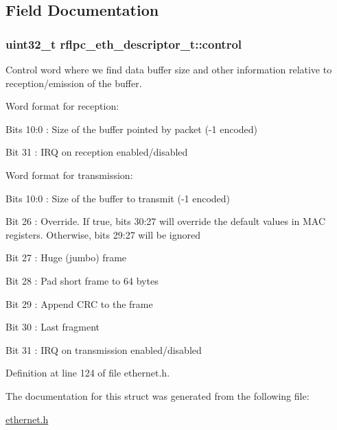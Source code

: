 \subsection{Field Documentation}
\hypertarget{structrflpc__eth__descriptor__t_ae45a50fb32e3ce25a5802290397dfe7e}{
\subsubsection[{control}]{\setlength{\rightskip}{0pt plus 5cm}uint32\-\_\-t {\bf rflpc\-\_\-eth\-\_\-descriptor\-\_\-t\-::control}}}\label{structrflpc__eth__descriptor__t_ae45a50fb32e3ce25a5802290397dfe7e}


Control word where we find data buffer size and other information relative to reception/emission of the buffer. 

Word format for reception\-:
\begin{DoxyItemize}
\item Bits 10\-:0 \-: Size of the buffer pointed by packet (-\/1 encoded)
\item Bit 31 \-: I\-R\-Q on reception enabled/disabled
\end{DoxyItemize}

Word format for transmission\-:
\begin{DoxyItemize}
\item Bits 10\-:0 \-: Size of the buffer to transmit (-\/1 encoded)
\item Bit 26 \-: Override. If true, bits 30\-:27 will override the default values in M\-A\-C registers. Otherwise, bits 29\-:27 will be ignored
\item Bit 27 \-: Huge (jumbo) frame
\item Bit 28 \-: Pad short frame to 64 bytes
\item Bit 29 \-: Append C\-R\-C to the frame
\item Bit 30 \-: Last fragment
\item Bit 31 \-: I\-R\-Q on transmission enabled/disabled 
\end{DoxyItemize}

Definition at line 124 of file ethernet.\-h.



The documentation for this struct was generated from the following file\-:\begin{DoxyCompactItemize}
\item 
\hyperlink{ethernet_8h}{ethernet.\-h}\end{DoxyCompactItemize}
